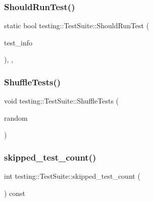 \subsubsection{\texorpdfstring{Should\+Run\+Test()}{ShouldRunTest()}}
{\footnotesize\ttfamily static bool testing\+::\+Test\+Suite\+::\+Should\+Run\+Test (\begin{DoxyParamCaption}\item[{const \hyperlink{classtesting_1_1TestInfo}{Test\+Info} $\ast$}]{test\+\_\+info }\end{DoxyParamCaption})\hspace{0.3cm}{\ttfamily [inline]}, {\ttfamily [static]}, {\ttfamily [private]}}

\mbox{\label{classtesting_1_1TestSuite_ab5c2055e93f43a2029e36adc5d75347a}} 
\subsubsection{\texorpdfstring{Shuffle\+Tests()}{ShuffleTests()}}
{\footnotesize\ttfamily void testing\+::\+Test\+Suite\+::\+Shuffle\+Tests (\begin{DoxyParamCaption}\item[{\hyperlink{classtesting_1_1internal_1_1Random}{internal\+::\+Random} $\ast$}]{random }\end{DoxyParamCaption})\hspace{0.3cm}{\ttfamily [private]}}

\mbox{\label{classtesting_1_1TestSuite_ae48c72ff92fa1c555e3b577f8661285c}} 
\subsubsection{\texorpdfstring{skipped\+\_\+test\+\_\+count()}{skipped\_test\_count()}}
{\footnotesize\ttfamily int testing\+::\+Test\+Suite\+::skipped\+\_\+test\+\_\+count (\begin{DoxyParamCaption}{ }\end{DoxyParamCaption}) const}

